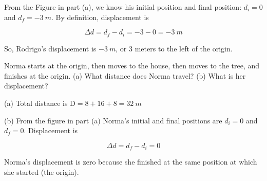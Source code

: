 \documentclass[main.tex]{subfiles}
\begin{document}
From the Figure in part (a), we know his initial position and final position: $d_i = 0$ and $d_f = -\SI{3}{m}$. By definition, displacement is

\begin{equation*}
    \Delta{d} = d_f - d_i = -3 - 0 = -\SI{3}{m}
\end{equation*}

So, Rodrigo's displacement is $-\SI{3}{m}$, or 3 meters to the left of the origin.

\solutionEnd

\begin{example} \label{mAnrq8}
Norma starts at the origin, then moves to the house, then moves to the tree, and finishes at the origin. (a) What distance does Norma travel? (b) What is her displacement? 
\end{example}

\Solution (a) Total distance is $\mathrm{D} = 8 + 16 + 8 = \SI{32}{m}$

\begin{center}
\end{center}

(b) From the figure in part (a) Norma's initial and final positions are $d_i = 0$ and $d_f = 0$. Displacement is 

\begin{equation*}
    \Delta d = d_f - d_i = 0
\end{equation*}

Norma's displacement is zero  because she finished at the same position at which she started (the origin).

\solutionEnd
\end{document}
